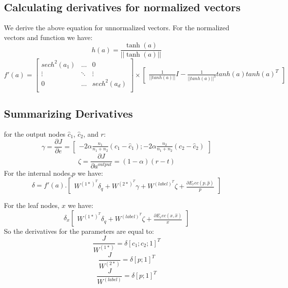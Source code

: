 \documentclass[twoside,12pt]{article}
\begin{document}
\subsection{Calculating derivatives for normalized vectors}
We derive the above equation for unnormalized vectors. For the normalized vectors and function we have:
\begin{equation}
h(a)=\frac{\tanh(a)}{||\tanh(a)||}
\end{equation}
\begin{equation}
f'(a)=
\begin{bmatrix}
sech^2(a_1) & \ldots & 0 \\
\vdots & \ddots & \vdots \\
0 & \ldots & sech^2(a_d) \\
\end{bmatrix} \times 
\begin{bmatrix}
\frac{1}{||tanh(a)||}I-\frac{1}{||tanh(a)||^3}tanh(a)tanh(a)^T
\end{bmatrix}
\end{equation}
\subsection{Summarizing Derivatives}
for the output nodes $\hat{c}_1$, $\hat{c}_2$, and $r$:
\begin{equation}
\gamma = \frac{\partial J}{\partial e} = 
\begin{bmatrix}
-2\alpha\frac{n_1}{n_1+n_2}(c_1-\hat{c}_1);-2\alpha\frac{n_2}{n_1+n_2}(c_2-\hat{c}_2)
\end{bmatrix}
\end{equation}
\begin{equation}
\zeta = \frac{\partial J}{\partial a^{output}} = 
(1-\alpha)(r-t)
\end{equation}
For the internal nodes,$p$ we have:
\begin{equation}
\delta = f'(a).
\begin{bmatrix}
W^{{(1*)}^T}\delta_q+W^{{(2*)}^T}\gamma+W^{{(label)}^T}\zeta+\frac{\partial E_rec(p,\hat{p})}{p}
\end{bmatrix}
\end{equation}

For the leaf nodes, $x$ we have:
\begin{equation}
\delta_x
\begin{bmatrix}
W^{{(1*)}^T}\delta_q+W^{{(label)}^T}\zeta+\frac{\partial E_rec(x,\hat{x})}{x}
\end{bmatrix}
\end{equation}
So the derivatives for the parameters are equal to:
\begin{equation}
\frac{J}{W^{(1*)}}=\delta[c_1;c_2;1]^T
\end{equation}
\begin{equation}
\frac{J}{W^{(2*)}}=\delta[p;1]^T
\end{equation}
\begin{equation}
\frac{J}{W^{(label)}}=\delta[p;1]^T
\end{equation}
\end{document}
